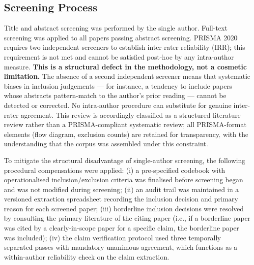 \subsection{Screening Process}

Title and abstract screening was performed by the single author.
Full-text screening was applied to all papers passing abstract screening.
PRISMA 2020 requires two independent screeners to establish inter-rater reliability
(IRR); this requirement is not met and cannot be satisfied post-hoc by any
intra-author measure.
\textbf{This is a structural defect in the methodology, not a cosmetic limitation.}
The absence of a second independent screener means that systematic biases in
inclusion judgements — for instance, a tendency to include papers whose abstracts
pattern-match to the author's prior reading — cannot be detected or corrected.
No intra-author procedure can substitute for genuine inter-rater agreement.
This review is accordingly classified as a structured literature review rather than a PRISMA-compliant systematic review;
all PRISMA-format elements (flow diagram, exclusion counts) are retained for transparency,
with the understanding that the corpus was assembled under this constraint.

To mitigate the structural disadvantage of single-author screening, the following procedural compensations were applied:
(i) a pre-specified codebook with operationalised inclusion/exclusion criteria was finalised before screening began and was not modified during screening;
(ii) an audit trail was maintained in a versioned extraction spreadsheet recording the inclusion decision and primary reason for each screened paper;
(iii) borderline inclusion decisions were resolved by consulting the primary literature of the citing paper (i.e., if a borderline paper was cited by a clearly-in-scope paper for a specific claim, the borderline paper was included);
(iv) the claim verification protocol used three temporally separated passes with mandatory unanimous agreement, which functions as a within-author reliability check on the claim extraction.


